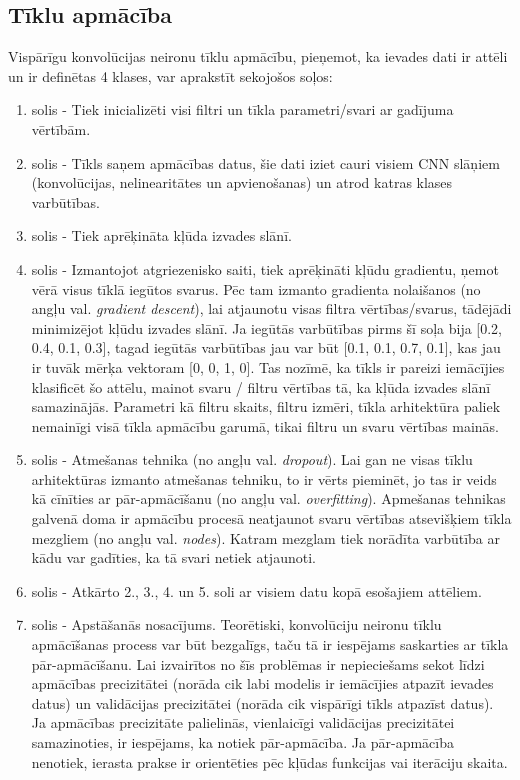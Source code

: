 \subsection{Tīklu apmācība}
Vispārīgu konvolūcijas neironu tīklu apmācību, pieņemot, ka ievades dati ir attēli un ir definētas 4 klases, var aprakstīt sekojošos soļos:
\begin{enumerate}
	\item solis - Tiek inicializēti visi filtri un tīkla parametri/svari ar gadījuma vērtībām.
	\item solis - Tīkls saņem apmācības datus, šie dati iziet cauri visiem CNN slāņiem (konvolūcijas, nelinearitātes un apvienošanas) un atrod katras klases varbūtības.
	\item solis - Tiek aprēķināta kļūda izvades slānī. 
	\item solis - Izmantojot atgriezenisko saiti, tiek aprēķināti kļūdu gradientu, ņemot vērā visus tīklā iegūtos svarus. Pēc tam izmanto gradienta nolaišanos (no angļu val. \textit{gradient descent}), lai atjaunotu visas filtra vērtības/svarus, tādējādi minimizējot kļūdu izvades slānī. Ja iegūtās varbūtības pirms šī soļa bija [0.2, 0.4, 0.1, 0.3], tagad iegūtās varbūtības jau var būt [0.1, 0.1, 0.7, 0.1], kas jau ir tuvāk mērķa vektoram [0, 0, 1, 0]. Tas nozīmē, ka tīkls ir pareizi iemācījies klasificēt šo attēlu, mainot svaru / filtru vērtības tā, ka kļūda izvades slānī samazinājās. Parametri kā filtru skaits, filtru izmēri, tīkla arhitektūra paliek nemainīgi visā tīkla apmācību garumā, tikai filtru un svaru vērtības mainās.
	\item solis - Atmešanas tehnika (no angļu val. \textit{dropout}). Lai gan ne visas tīklu arhitektūras izmanto atmešanas tehniku, to ir vērts pieminēt, jo tas ir veids kā cīnīties ar pār-apmācīšanu (no angļu val. \textit{overfitting}). Apmešanas tehnikas galvenā doma ir apmācību procesā neatjaunot svaru vērtības atsevišķiem tīkla mezgliem (no angļu val. \textit{nodes}). Katram mezglam tiek norādīta varbūtība ar kādu var gadīties, ka tā svari netiek atjaunoti.
	\item solis - Atkārto 2., 3., 4. un 5. soli ar visiem datu kopā esošajiem attēliem.
	\item solis - Apstāšanās nosacījums. Teorētiski, konvolūciju neironu tīklu apmācīšanas process var būt bezgalīgs, taču tā ir iespējams saskarties ar tīkla pār-apmācīšanu. Lai izvairītos no šīs problēmas ir nepieciešams sekot līdzi apmācības precizitātei (norāda cik labi modelis ir iemācījies atpazīt ievades datus) un validācijas precizitātei (norāda cik vispārīgi tīkls atpazīst datus). Ja apmācības precizitāte palielinās, vienlaicīgi validācijas precizitātei samazinoties, ir iespējams, ka notiek pār-apmācība. Ja pār-apmācība nenotiek, ierasta prakse ir orientēties pēc kļūdas funkcijas vai iterāciju skaita.
\end{enumerate}

